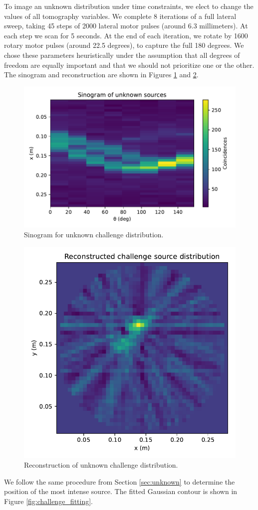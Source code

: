 \documentclass[12pt, letterpaper]{article}
\begin{document}
To image an unknown distribution under time constraints, we elect to change the values of all tomography variables. We complete 8 iterations of a full lateral sweep, taking 45 steps of 2000 lateral motor pulses (around 6.3 millimeters). At each step we scan for 5 seconds. At the end of each iteration, we rotate by 1600 rotary motor pulses (around 22.5 degrees), to capture the full 180 degrees. We chose these parameters heuristically under the assumption that all degrees of freedom are equally important and that we should not prioritize one or the other. The sinogram and reconstruction are shown in Figures \ref{fig:challenge_sinogram} and \ref{fig:challenge_reconstruction}. 
\begin{figure}
    \centering
    \includegraphics[width=0.75\linewidth]{experiment5/figures/challenge_sinogram.pdf}
    \caption{Sinogram for unknown challenge distribution. }
    \label{fig:challenge_sinogram}
\end{figure}
\begin{figure}
    \centering
    \includegraphics[width=0.75\linewidth]{experiment5/figures/challenge_reconstruction.pdf}
    \caption{Reconstruction of unknown challenge distribution. }
    \label{fig:challenge_reconstruction}
\end{figure}
We follow the same procedure from Section \ref{sec:unknown} to determine the position of the most intense source. The fitted Gaussian contour is shown in Figure \ref{fig:challenge_fitting}. 
\end{document}
